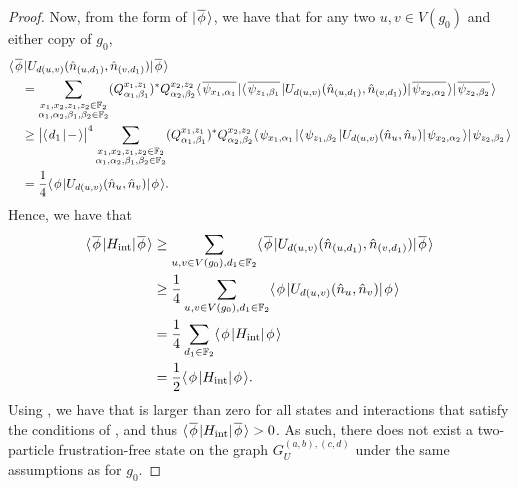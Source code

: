 \documentclass[../thesis-main/thesis-main]{subfiles}
\begin{document}
\begin{proof}
  Now, from the form of $|\mspace{2mu} \overline{\phi} \mspace{2mu} \rangle$, we have that for any two $u,v\in V(g_0)$ and either copy of $g_0$,
  \begin{align}
    &\langle\mspace{2mu} \overline{\phi} \mspace{2mu} | U_{d(u,v)} (\hat{n}_{(u,d_1)},\hat{n}_{(v,d_1)}) |\mspace{2mu} \overline{\phi} \mspace{2mu} \rangle \nonumber\\
    &\quad = \sum_{\substack{x_1,x_2,z_1,z_2\in\mathbb{F}_2\\\alpha_1,\alpha_2,\beta_1,\beta_2\in\mathbb{F}_2}}
    (Q_{\alpha_1,\beta_1}^{x_1,z_1})^* Q_{\alpha_2,\beta_2}^{x_2,z_2} \langle\mspace{2mu} \overline{\psi_{x_1,\alpha_1}} \mspace{2mu} |\langle\mspace{2mu} \overline{\psi_{z_1,\beta_1}} \mspace{2mu} | U_{d(u,v)}(\hat{n}_{(u,d_1)},\hat{n}_{(v,d_1)}) |\mspace{2mu} \overline{\psi_{x_2,\alpha_2}} \mspace{2mu} \rangle|\mspace{2mu} \overline{\psi_{z_2,\beta_2}} \mspace{2mu} \rangle\\
    &\quad \geq \big|\langle\mspace{2mu} d_1 \mspace{2mu} | \mspace{2mu} -\mspace{2mu} \rangle\big|^4\sum_{\substack{x_1,x_2,z_1,z_2\in\mathbb{F}_2\\\alpha_1,\alpha_2,\beta_1,\beta_2\in\mathbb{F}_2}}
    (Q_{\alpha_1,\beta_1}^{x_1,z_1})^* Q_{\alpha_2,\beta_2}^{x_2,z_2} \langle\mspace{2mu} \psi_{x_1,\alpha_1} \mspace{2mu} |\langle\mspace{2mu} \psi_{z_1,\beta_2} \mspace{2mu} | U_{d(u,v)}(\hat{n}_{u},\hat{n}_{v}) |\mspace{2mu} \psi_{x_2,\alpha_2} \mspace{2mu} \rangle|\mspace{2mu} \psi_{z_2,\beta_2} \mspace{2mu} \rangle\\
    &\quad = \frac{1}{4} \langle\mspace{2mu} \phi \mspace{2mu} | U_{d(u,v)}(\hat{n}_u,\hat{n}_v)|\mspace{2mu} \phi \mspace{2mu} \rangle.
  \end{align}
  Hence, we have that
  \begin{align}
    \langle\mspace{2mu} \overline{\phi} \mspace{2mu} | H_{\text{int}} |\mspace{2mu} \overline{\phi} \mspace{2mu} \rangle& \geq  \sum_{u,v\in V(g_0),d_1\in \mathbb{F}_2} \langle\mspace{2mu} \overline{\phi} \mspace{2mu} | U_{d(u,v)} (\hat{n}_{(u,d_1)},\hat{n}_{(v,d_1)}) |\mspace{2mu} \overline{\phi} \mspace{2mu} \rangle\\
     &\geq \frac{1}{4} \sum_{u,v\in V(g_0), d_1\in \mathbb{F}_2} \langle\mspace{2mu} \phi \mspace{2mu} | U_{d(u,v)}(\hat{n}_u,\hat{n}_v) |\mspace{2mu} \phi \mspace{2mu} \rangle\\
     &= \frac{1}{4} \sum_{d_1\in \mathbb{F}_2} \langle\mspace{2mu} \phi \mspace{2mu} | H_{\text{int}} |\mspace{2mu} \phi \mspace{2mu} \rangle\\
     &= \frac{1}{2} \langle\mspace{2mu} \phi \mspace{2mu} | H_{\text{int}} |\mspace{2mu} \phi \mspace{2mu} \rangle\label{eq:g0_and_diagram_element_relation}.
  \end{align}
  Using , we have that  is larger than zero for all states and interactions that satisfy the conditions of , and thus $\langle\mspace{2mu} \overline{\phi} \mspace{2mu} | H_{\text{int}} |\mspace{2mu} \overline{\phi} \mspace{2mu} \rangle >0$.  As such, there does not exist a two-particle frustration-free state on the graph $G_U^{(a,b),(c,d)}$ under the same assumptions as for $g_0$.

\end{proof}

\end{document}
